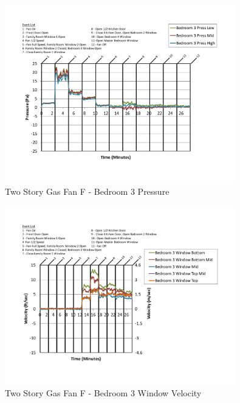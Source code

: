\documentclass{article}
\begin{document}
\begin{appendices}
	\begin{figure}[H]
		\centering
		\includegraphics[height=3.05in,trim=0.67in 1.1in 0.67in 0.8in,clip=true]{0_Images/Results_Charts/ColdFlow/Two_Story/Gas/F/Bedroom_3_Pressure.pdf}
		\caption{Two Story Gas Fan F - Bedroom 3 Pressure}
	\end{figure}
 

	\begin{figure}[H]
		\centering
		\includegraphics[height=3.05in,trim=0.67in 1.1in 0.67in 0.8in,clip=true]{0_Images/Results_Charts/ColdFlow/Two_Story/Gas/F/Bedroom_3_Window_Velocity.pdf}
		\caption{Two Story Gas Fan F - Bedroom 3 Window Velocity}
	\end{figure}
 
	\clearpage


\end{appendices}
\end{document}
